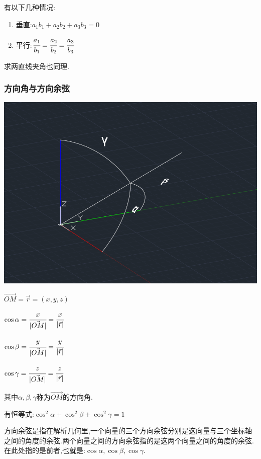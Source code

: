 {{{\begin{itemize}
{              有以下几种情况:
              \begin{enumerate}
                \item 垂直:$a_1b_1 + a_2b_2 + a_3b_3 = 0$
                \item 平行:$\cfrac{a_1}{b_1} = \cfrac{a_2}{b_2} = \cfrac{a_3}{b_3}$
              \end{enumerate}

              求两直线夹角也同理.
              }
      \end{itemize}
    }%

    \subsubsection{方向角与方向余弦}{
      \begin{center}
        \includegraphics[scale = 0.5]{resources/directionAngle.png}
      \end{center}

      $\vec{OM} = \vec{r} = (x,y,z)$

      $\cos\alpha = \cfrac{x}{|\vec{OM}|} = \cfrac{x}{|\vec{r}|}$

      $\cos\beta = \cfrac{y}{|\vec{OM}|} = \cfrac{y}{|\vec{r}|}$

      $\cos\gamma = \cfrac{z}{|\vec{OM}|} = \cfrac{z}{|\vec{r}|}$

      其中$\alpha,\beta,\gamma$称为$\vec{OM}$的方向角.

      有恒等式:$\cos^2\alpha + \cos^2\beta + \cos^2\gamma = 1$

      方向余弦是指在解析几何里,一个向量的三个方向余弦分别是这向量与三个坐标轴之间的角度的余弦.两个向量之间的方向余弦指的是这两个向量之间的角度的余弦.在此处指的是前者,也就是:$\cos\alpha,\cos\beta,\cos\gamma$.

}}}
